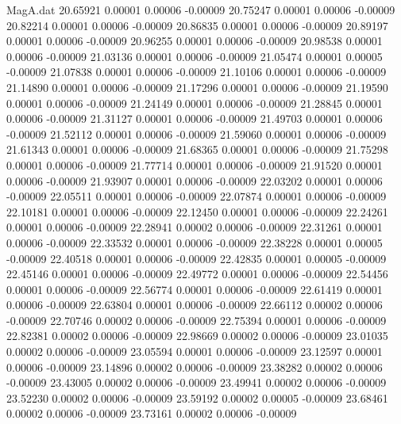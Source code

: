 \begin{filecontents}{MagA.dat}
  20.65921    0.00001    0.00006   -0.00009
  20.75247    0.00001    0.00006   -0.00009
  20.82214    0.00001    0.00006   -0.00009
  20.86835    0.00001    0.00006   -0.00009
  20.89197    0.00001    0.00006   -0.00009
  20.96255    0.00001    0.00006   -0.00009
  20.98538    0.00001    0.00006   -0.00009
  21.03136    0.00001    0.00006   -0.00009
  21.05474    0.00001    0.00005   -0.00009
  21.07838    0.00001    0.00006   -0.00009
  21.10106    0.00001    0.00006   -0.00009
  21.14890    0.00001    0.00006   -0.00009
  21.17296    0.00001    0.00006   -0.00009
  21.19590    0.00001    0.00006   -0.00009
  21.24149    0.00001    0.00006   -0.00009
  21.28845    0.00001    0.00006   -0.00009
  21.31127    0.00001    0.00006   -0.00009
  21.49703    0.00001    0.00006   -0.00009
  21.52112    0.00001    0.00006   -0.00009
  21.59060    0.00001    0.00006   -0.00009
  21.61343    0.00001    0.00006   -0.00009
  21.68365    0.00001    0.00006   -0.00009
  21.75298    0.00001    0.00006   -0.00009
  21.77714    0.00001    0.00006   -0.00009
  21.91520    0.00001    0.00006   -0.00009
  21.93907    0.00001    0.00006   -0.00009
  22.03202    0.00001    0.00006   -0.00009
  22.05511    0.00001    0.00006   -0.00009
  22.07874    0.00001    0.00006   -0.00009
  22.10181    0.00001    0.00006   -0.00009
  22.12450    0.00001    0.00006   -0.00009
  22.24261    0.00001    0.00006   -0.00009
  22.28941    0.00002    0.00006   -0.00009
  22.31261    0.00001    0.00006   -0.00009
  22.33532    0.00001    0.00006   -0.00009
  22.38228    0.00001    0.00005   -0.00009
  22.40518    0.00001    0.00006   -0.00009
  22.42835    0.00001    0.00005   -0.00009
  22.45146    0.00001    0.00006   -0.00009
  22.49772    0.00001    0.00006   -0.00009
  22.54456    0.00001    0.00006   -0.00009
  22.56774    0.00001    0.00006   -0.00009
  22.61419    0.00001    0.00006   -0.00009
  22.63804    0.00001    0.00006   -0.00009
  22.66112    0.00002    0.00006   -0.00009
  22.70746    0.00002    0.00006   -0.00009
  22.75394    0.00001    0.00006   -0.00009
  22.82381    0.00002    0.00006   -0.00009
  22.98669    0.00002    0.00006   -0.00009
  23.01035    0.00002    0.00006   -0.00009
  23.05594    0.00001    0.00006   -0.00009
  23.12597    0.00001    0.00006   -0.00009
  23.14896    0.00002    0.00006   -0.00009
  23.38282    0.00002    0.00006   -0.00009
  23.43005    0.00002    0.00006   -0.00009
  23.49941    0.00002    0.00006   -0.00009
  23.52230    0.00002    0.00006   -0.00009
  23.59192    0.00002    0.00005   -0.00009
  23.68461    0.00002    0.00006   -0.00009
  23.73161    0.00002    0.00006   -0.00009

\end{filecontents}
